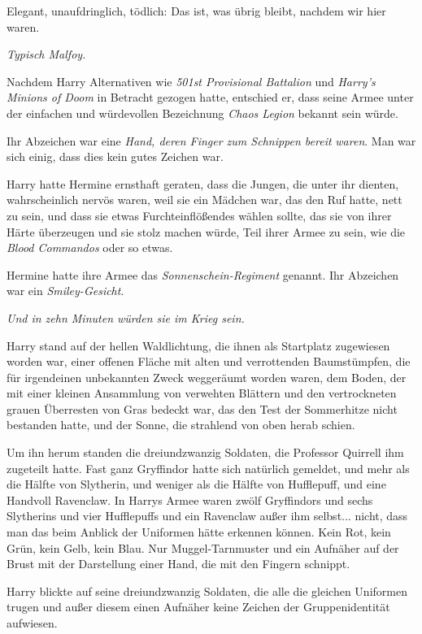 Elegant, unaufdringlich, tödlich: Das ist, was übrig bleibt, nachdem wir hier
waren.

\emph{Typisch Malfoy.}

Nachdem Harry Alternativen wie \emph{501st Provisional Battalion }und
\emph{Harry's Minions of Doom }in Betracht gezogen hatte, entschied er, dass
seine Armee unter der einfachen und würdevollen Bezeichnung \emph{Chaos Legion}
bekannt sein würde.

Ihr Abzeichen war eine \emph{Hand, deren Finger zum Schnippen bereit}
\emph{waren}. Man war sich einig, dass dies kein gutes Zeichen war.

Harry hatte Hermine ernsthaft geraten, dass die Jungen, die unter ihr dienten,
wahrscheinlich nervös waren, weil sie ein Mädchen war, das den Ruf hatte, nett
zu sein, und dass sie etwas Furchteinflößendes wählen sollte, das sie von ihrer
Härte überzeugen und sie stolz machen würde, Teil ihrer Armee zu sein, wie die
\emph{Blood Commandos }oder so etwas.

Hermine hatte ihre Armee das \emph{Sonnenschein-Regiment} genannt. Ihr Abzeichen
war ein \emph{Smiley-Gesicht}.

\emph{Und in zehn Minuten würden sie im Krieg sein.}

Harry stand auf der hellen Waldlichtung, die ihnen als Startplatz zugewiesen
worden war, einer offenen Fläche mit alten und verrottenden Baumstümpfen, die
für irgendeinen unbekannten Zweck weggeräumt worden waren, dem Boden, der mit
einer kleinen Ansammlung von verwehten Blättern und den vertrockneten grauen
Überresten von Gras bedeckt war, das den Test der Sommerhitze nicht bestanden
hatte, und der Sonne, die strahlend von oben herab schien.

Um ihn herum standen die dreiundzwanzig Soldaten, die Professor Quirrell ihm
zugeteilt hatte. Fast ganz Gryffindor hatte sich natürlich gemeldet, und mehr
als die Hälfte von Slytherin, und weniger als die Hälfte von Hufflepuff, und
eine Handvoll Ravenclaw. In Harrys Armee waren zwölf Gryffindors und sechs
Slytherins und vier Hufflepuffs und ein Ravenclaw außer ihm selbst... nicht,
dass man das beim Anblick der Uniformen hätte erkennen können. Kein Rot, kein
Grün, kein Gelb, kein Blau. Nur Muggel-Tarnmuster und ein Aufnäher auf der Brust
mit der Darstellung einer Hand, die mit den Fingern schnippt.

Harry blickte auf seine dreiundzwanzig Soldaten, die alle die gleichen Uniformen
trugen und außer diesem einen Aufnäher keine Zeichen der Gruppenidentität
aufwiesen.

